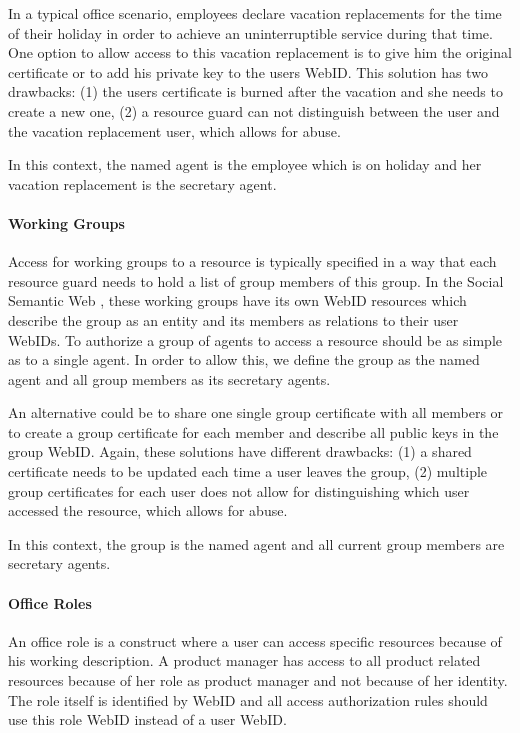 \documentclass[a4paper]{llncs}
\begin{document}
In a typical office scenario, employees declare vacation replacements for the time of their holiday in order to achieve an uninterruptible service during that time.
One option to allow access to this vacation replacement is to give him the original certificate or to add his private key to the users WebID.
This solution has two drawbacks: (1) the users certificate is burned after the vacation and she needs to create a new one, (2) a resource guard can not distinguish between the user and the vacation replacement user, which allows for abuse.

In this context, the named agent is the employee which is on holiday and her vacation replacement is the secretary agent.

\paragraph{Working Groups}\label{sec:WorkingGroups}
Access for working groups to a resource is typically specified in a way that each resource guard  needs to hold a list of group members of this group.
In the Social Semantic Web , these working groups have its own WebID resources which describe the group as an entity and its members as relations to their user WebIDs.
To authorize a group of agents to access a resource should be as simple as to a single agent.
In order to allow this, we define the group as the named agent and all group members as its secretary agents.

An alternative could be to share one single group certificate with all members or to create a group certificate for each member and describe all public keys in the group WebID.
Again, these solutions have different drawbacks: (1) a shared certificate needs to be updated each time a user leaves the group, (2) multiple group certificates for each user does not allow for distinguishing which user accessed the resource, which allows for abuse. 

In this context, the group is the named agent and all current group members are secretary agents.%

\paragraph{Office Roles}
An office role is a construct where a user can access specific resources because of his working description.
A product manager has access to all product related resources because of her role as product manager and not because of her identity.
The role itself is identified by WebID and all access authorization rules should use this role WebID instead of a user WebID.
\end{document}
